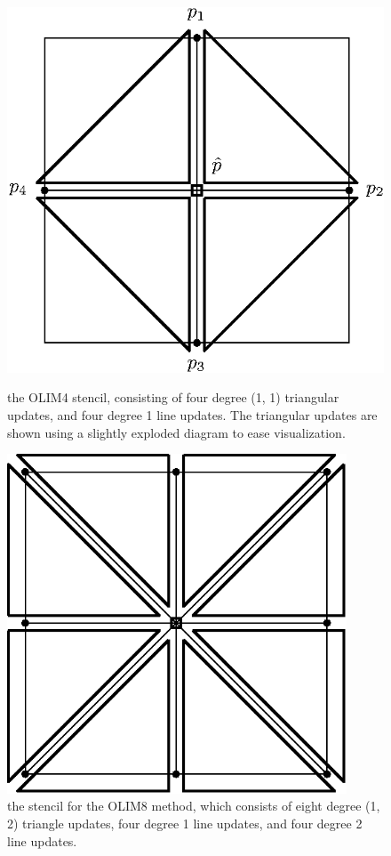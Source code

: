 \documentclass{article}
\begin{document}
\begin{figure}
  \centering
  \begin{minipage}[c]{0.47\textwidth}
    \centering
    \includegraphics[width=\textwidth]{olim4-stencil.eps}
    \caption{the OLIM4 stencil, consisting of four degree (1, 1)
      triangular updates, and four degree 1 line updates. The
      triangular updates are shown using a slightly exploded diagram
      to ease visualization.}\label{fig:olim4-stencil}
  \end{minipage}
  \hfill
  \begin{minipage}[c]{0.47\textwidth}
    \centering
    \includegraphics[width=0.9\textwidth]{olim8-stencil.eps}
    \caption{the stencil for the OLIM8 method, which consists of eight
      degree (1, 2) triangle updates, four degree 1 line updates, and
      four degree 2 line updates.}\label{fig:olim8-stencil}
  \end{minipage}
\end{figure}
\end{document}
